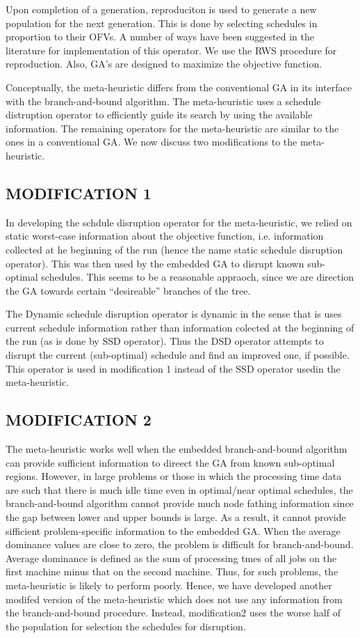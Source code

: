 \documentclass[pdftex,11pt]{article}
\begin{document}
Upon completion of a generation, reproduciton is used to generate a new population for the next generation. This is done by selecting schedules in proportion to their OFVs. A number of ways have been suggested in the literature for implementation of this operator. We use the RWS procedure for reproduction. Also, GA's are designed to maximize the objective function. 

Conceptually, the meta-heuristic differs from the conventional GA in its interface with the branch-and-bound algorithm. The meta-heuristic uses a schedule distruption operator to efficiently guide its search by using the available information. The remaining operators for the meta-heuristic are similar to the ones in a conventional GA. We now discuss two modifications to the meta-heuristic.

\subsection{MODIFICATION 1}
In developing the schdule disruption operator for the meta-heuristic, we relied on static worst-case information about the objective function, i.e. information collected at he beginning of the run (hence the name static schedule disruption operator). This was then used by the embedded GA to disrupt known sub-optimal schedules. This seems to be a reasonable appraoch, since we are direction the GA towards certain ``desireable'' branches of the tree.

The Dynamic schedule disruption operator is dynamic in the sense that is uses current schedule information rather than information colected at the beginning of the run (as is done by SSD operator). Thus the DSD operator attempts to disrupt the current (sub-optimal) schedule and find an improved one, if possible. This operator is used in modification 1 instead of the SSD operator usedin the meta-heuristic.
\subsection{MODIFICATION 2}
The meta-heuristic works well when the embedded branch-and-bound algorithm can provide sufficient information to direect the GA from known sub-optimal regions. However, in large problems or those in which the processing time data are such that there is much idle time even in optimal/near optimal schedules, the branch-and-bound algorithm cannot provide much node fathing information since the gap between lower and upper bounds is large. As a result, it cannot provide sifficient problem-specific information to the embedded GA.  When the average dominance values are close to zero, the problem is difficult for branch-and-bound. Average dominance is defined as the sum of processing tmes of all jobs on the first machine minus that on the second machine. Thus, for such problems, the meta-heuristic is likely to perform poorly. Hence, we have developed another modifed version of the meta-heuristic which does not use any information from the branch-and-bound procedure. Instead, modification2 uses the worse half of the population for selection the schedules for disruption. 
\end{document}
